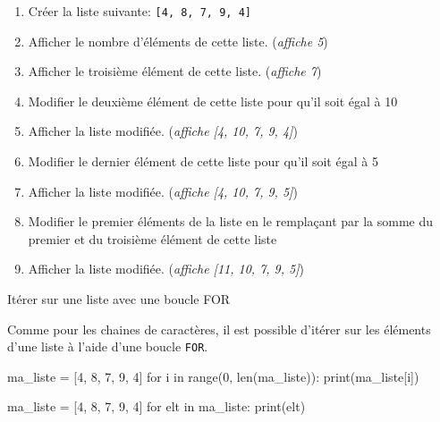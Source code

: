 \begin{exercice_cours}{}

	\begin{enumerate}
		\item Créer la liste suivante: \verb|[4, 8, 7, 9, 4]|
		\item Afficher le nombre d'éléments de cette liste. (\emph{affiche 5})
		\item Afficher le troisième élément de cette liste. (\emph{affiche 7})
		\item Modifier le deuxième élément de cette liste pour qu'il soit égal à 10
		\item Afficher la liste modifiée. (\emph{affiche [4, 10, 7, 9, 4]})
		\item Modifier le dernier élément de cette liste pour qu'il soit égal à 5
		\item Afficher la liste modifiée. (\emph{affiche [4, 10, 7, 9, 5]})
		\item Modifier le premier éléments de la liste en le remplaçant par la somme du premier et du troisième élément de cette liste
		\item Afficher la liste modifiée. (\emph{affiche [11, 10, 7, 9, 5]})

	\end{enumerate}
\end{exercice_cours}

\begin{easybox}{Itérer sur une liste avec une boucle FOR}{}

	Comme pour les chaines de caractères, il est possible d'itérer sur les éléments d'une liste à l'aide d'une boucle \verb|FOR|.	

	\smallskip
	\begin{minipage}{0.48\linewidth}
		\begin{CodePythontexAlt}[Largeur=1\linewidth,Centre,PremLigne=1]{}
ma_liste = [4, 8, 7, 9, 4]
for i in range(0, len(ma_liste)):
	print(ma_liste[i])
		\end{CodePythontexAlt}
	\end{minipage}\hfill
	\begin{minipage}{0.48\linewidth}
		\begin{CodePythontexAlt}[Largeur=1\linewidth,Centre,PremLigne=1]{}
ma_liste = [4, 8, 7, 9, 4]
for elt in ma_liste:
	print(elt)
		\end{CodePythontexAlt}
	\end{minipage}
\end{easybox}

